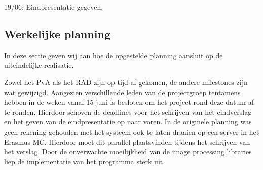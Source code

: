 19/06: Eindpresentatie gegeven.

\subsection{Werkelijke planning}
\label{werkelijke_planning}

In deze sectie geven wij aan hoe de opgestelde planning aansluit op de
uiteindelijke realisatie.

Zowel het PvA als het RAD zijn op tijd af gekomen, de andere milestones zijn
wat gewijzigd. Aangezien verschillende leden van de projectgroep tentamens
hebben in de weken vanaf 15 juni is besloten om het project rond deze datum af
te ronden. Hierdoor schoven de deadlines voor het schrijven van het eindverslag
en het geven van de eindpresentatie op naar voren. In de originele planning was
geen rekening gehouden met het systeem ook te laten draaien op een server in
het Erasmus MC. Hierdoor moet dit parallel plaatsvinden tijdens het schrijven
van het verslag. Door de onverwachte moeilijkheid van de image processing
libraries liep de implementatie van het programma sterk uit.

